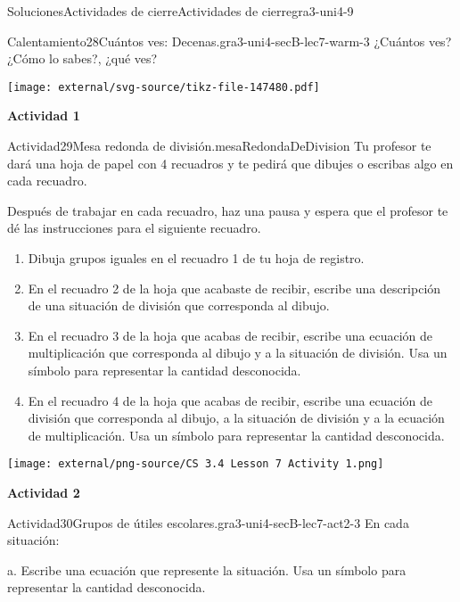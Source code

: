 \documentclass[twoside,10pt,]{article}
\begin{document}
\begin{solutions-section}{Soluciones}{Actividades de cierre}{}{Actividades de cierre}{}{}{gra3-uni4-9}
\begin{explorationsolution}{Calentamiento}{28}{Cuántos ves: Decenas.}{gra3-uni4-secB-lec7-warm-3}%
¿Cuántos ves? ¿Cómo lo sabes?, ¿qué ves?%
\begin{image}{0}{1}{0}{}%
\texttt{[image: external/svg-source/tikz-file-147480.pdf]}
\end{image}%
\end{explorationsolution}%
\par\medskip
\noindent\textbf{\large{}\space\textperiodcentered\space{}Actividad 1}
\begin{activitysolution}{Actividad}{29}{Mesa redonda de división.}{mesaRedondaDeDivision}%
Tu profesor te dará una hoja de papel con 4 recuadros y te pedirá que dibujes o escribas algo en cada recuadro.%
\par
Después de trabajar en cada recuadro, haz una pausa y espera que el profesor te dé las instrucciones para el siguiente recuadro.%
%
\begin{enumerate}
\item{}Dibuja grupos iguales en el recuadro 1 de tu hoja de registro.%
\item{}En el recuadro 2 de la hoja que acabaste de recibir, escribe una descripción de una situación de división que corresponda al dibujo.%
\item{}En el recuadro 3 de la hoja que acabas de recibir, escribe una ecuación de multiplicación que corresponda al dibujo y a la situación de división. Usa un símbolo para representar la cantidad desconocida.%
\item{}En el recuadro 4 de la hoja que acabas de recibir, escribe una ecuación de división que corresponda al dibujo, a la situación de división y a la ecuación de multiplicación. Usa un símbolo para representar la cantidad desconocida.%
\end{enumerate}
\begin{image}{0.2}{0.6}{0.2}{}%
\texttt{[image: external/png-source/CS 3.4 Lesson 7 Activity 1.png]}
\end{image}%
\end{activitysolution}%
\par\medskip
\noindent\textbf{\large{}\space\textperiodcentered\space{}Actividad 2}
\begin{activitysolution}{Actividad}{30}{Grupos de útiles escolares.}{gra3-uni4-secB-lec7-act2-3}%
En cada situación:%
\par
a. Escribe una ecuación que represente la situación. Usa un símbolo para representar la cantidad desconocida.%

\end{activitysolution}
\end{solutions-section}
\end{document}
